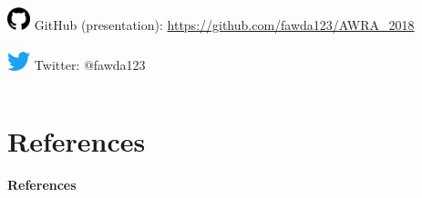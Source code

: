 \documentclass[serif]{beamer}\usepackage[]{graphicx}\usepackage[]{color}
\begin{document}
\begin{frame}
\begin{columns}
\begin{column}{0.5\textwidth}
\includegraphics[width = 0.05\textwidth]{fig/git.png} GitHub (presentation): \href{https://github.com/fawda123/AWRA_2018}{https://github.com/fawda123/AWRA\_2018}\\~\\
\includegraphics[width = 0.05\textwidth]{fig/twitter.png} Twitter: @fawda123
\end{column}
\end{columns}
\vspace{0.2in}
\end{frame}


\section{References}
\begin{frame}[t,shrink]{\textbf{References}}
\tiny
{}


\end{frame}
\end{document}
